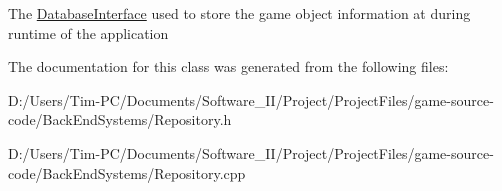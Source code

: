 The \hyperlink{class_database_interface}{Database\+Interface} used to store the game object information at during runtime of the application 

The documentation for this class was generated from the following files\+:\begin{DoxyCompactItemize}
\item 
D\+:/\+Users/\+Tim-\/\+P\+C/\+Documents/\+Software\+\_\+\+I\+I/\+Project/\+Project\+Files/game-\/source-\/code/\+Back\+End\+Systems/Repository.\+h\item 
D\+:/\+Users/\+Tim-\/\+P\+C/\+Documents/\+Software\+\_\+\+I\+I/\+Project/\+Project\+Files/game-\/source-\/code/\+Back\+End\+Systems/Repository.\+cpp\end{DoxyCompactItemize}
